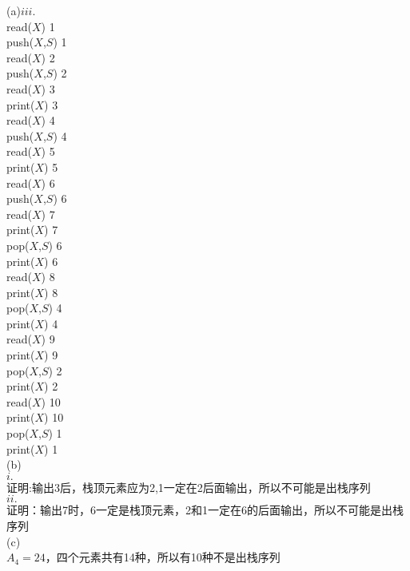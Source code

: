 \documentclass[a4paper, justified]{tufte-handout}
\begin{document}
\begin{solution}
  (a)$iii.$\\
  read($X$) 1\\
  push($X$,$S$) 1\\
  read($X$) 2\\
  push($X$,$S$) 2\\
  read($X$) 3\\
  print($X$) 3\\
  read($X$) 4\\
  push($X$,$S$) 4\\
  read($X$) 5\\
  print($X$) 5\\
  read($X$) 6\\
  push($X$,$S$) 6\\
  read($X$) 7\\
  print($X$) 7\\
  pop($X$,$S$) 6\\
  print($X$) 6\\
  read($X$) 8\\
  print($X$) 8\\
  pop($X$,$S$) 4\\
  print($X$) 4\\
  read($X$) 9\\
  print($X$) 9\\
  pop($X$,$S$) 2\\
  print($X$) 2\\
  read($X$) 10\\
  print($X$) 10\\
  pop($X$,$S$) 1\\
  print($X$) 1\\
  (b)\\
  $i.$\\
  证明:输出3后，栈顶元素应为2,1一定在2后面输出，所以不可能是出栈序列\\
  $ii.$\\
  证明：输出7时，6一定是栈顶元素，2和1一定在6的后面输出，所以不可能是出栈序列\\
  (c)\\
  $A_4 = 24$，四个元素共有14种，所以有10种不是出栈序列

\end{solution}

\begin{problem}
\end{problem}
\end{document}
